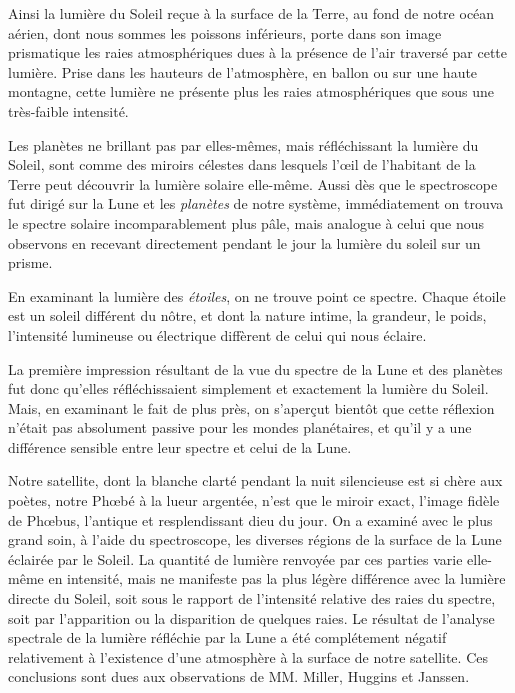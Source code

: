 \documentclass[a4paper, 11pt, oneside]{article}
\begin{document}
Ainsi la lumière du Soleil reçue à la surface de la Terre, au fond de notre océan aérien, dont nous sommes les poissons inférieurs, porte dans son image prismatique les raies atmosphériques dues à la présence de l'air traversé par cette lumière. Prise dans les hauteurs de l'atmosphère, en ballon ou sur une haute montagne, cette lumière ne présente plus les raies atmosphériques que sous une très-faible intensité.

Les planètes ne brillant pas par elles-mêmes, mais réfléchissant la lumière du Soleil, sont comme des miroirs célestes dans lesquels l'œil de l'habitant de la Terre peut découvrir la lumière solaire elle-même. Aussi dès que le spectroscope fut dirigé sur la Lune et les \emph{planètes} de notre système, immédiatement on trouva le spectre solaire incomparablement plus pâle, mais analogue à celui que nous observons en recevant directement pendant le jour la lumière du soleil sur un prisme.

En examinant la lumière des \emph{étoiles}, on ne trouve point ce spectre. Chaque étoile est un soleil différent du nôtre, et dont la nature intime, la grandeur, le poids, l'intensité lumineuse ou électrique diffèrent de celui qui nous éclaire.

La première impression résultant de la vue du spectre de la Lune et des planètes fut donc qu'elles réfléchissaient simplement et exactement la lumière du Soleil. Mais, en examinant le fait de plus près, on s'aperçut bientôt que cette réflexion n'était pas absolument passive pour les mondes planétaires, et qu'il y a une différence sensible entre leur spectre et celui de la Lune.

Notre satellite, dont la blanche clarté pendant la nuit silencieuse est si chère aux poètes, notre Phœbé à la lueur argentée, n'est que le miroir exact, l'image fidèle de Phœbus, l'antique et resplendissant dieu du jour. On a examiné avec le plus grand soin, à l'aide du spectroscope, les diverses régions de la surface de la Lune éclairée par le Soleil. La quantité de lumière renvoyée par ces parties varie elle-même en intensité, mais ne manifeste pas la plus légère différence avec la lumière directe du Soleil, soit sous le rapport de l'intensité relative des raies du spectre, soit par l'apparition ou la disparition de quelques raies. Le résultat de l'analyse spectrale de la lumière réfléchie par la Lune a été complétement négatif relativement à l'existence d'une atmosphère à la surface de notre satellite. Ces conclusions sont dues aux observations de MM. Miller, Huggins et Janssen.
\end{document}
